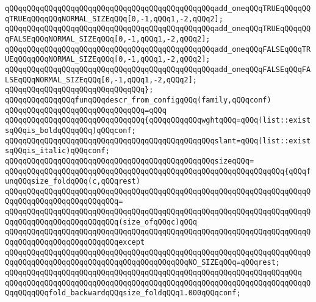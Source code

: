 \verb|qQQqqQQqqQQqqQQqqQQqqQQqqQQqqQQqqQQqqQQqqQQqqQQqadd_oneqQQqTRUEqQQqqQQqTRUEqQQqqQQqNORMAL_SIZEqQQq[0,-1,qQQq1,-2,qQQq2];|\newline
\verb|qQQqqQQqqQQqqQQqqQQqqQQqqQQqqQQqqQQqqQQqqQQqqQQqadd_oneqQQqTRUEqQQqqQQqFALSEqQQqNORMAL_SIZEqQQq[0,-1,qQQq1,-2,qQQq2];|\newline
\verb|qQQqqQQqqQQqqQQqqQQqqQQqqQQqqQQqqQQqqQQqqQQqqQQqadd_oneqQQqFALSEqQQqTRUEqQQqqQQqNORMAL_SIZEqQQq[0,-1,qQQq1,-2,qQQq2];|\newline
\verb|qQQqqQQqqQQqqQQqqQQqqQQqqQQqqQQqqQQqqQQqqQQqqQQqadd_oneqQQqFALSEqQQqFALSEqQQqNORMAL_SIZEqQQq[0,-1,qQQq1,-2,qQQq2];|\newline
\verb|qQQqqQQqqQQqqQQqqQQqqQQqqQQqqQQq};|\newline
\newline
\newline
\verb|qQQqqQQqqQQqqQQqfunqQQqdescr_from_configqQQq(family,qQQqconf)|\newline
\verb|qQQqqQQqqQQqqQQqqQQqqQQqqQQqqQQq=qQQq|\newline
\verb|qQQqqQQqqQQqqQQqqQQqqQQqqQQqqQQq{qQQqqQQqqQQqwghtqQQq=qQQq(list::existsqQQqis_boldqQQqqQQq)qQQqconf;|\newline
\verb|qQQqqQQqqQQqqQQqqQQqqQQqqQQqqQQqqQQqqQQqqQQqqQQqslant=qQQq(list::existsqQQqis_italic)qQQqconf;|\newline
\verb|qQQqqQQqqQQqqQQqqQQqqQQqqQQqqQQqqQQqqQQqqQQqqQQqsizeqQQq=|\newline
\verb|qQQqqQQqqQQqqQQqqQQqqQQqqQQqqQQqqQQqqQQqqQQqqQQqqQQqqQQqqQQqqQQq{qQQqfunqQQqsize_foldqQQq(c,qQQqrest)|\newline
\verb|qQQqqQQqqQQqqQQqqQQqqQQqqQQqqQQqqQQqqQQqqQQqqQQqqQQqqQQqqQQqqQQqqQQqqQQqqQQqqQQqqQQqqQQqqQQqqQQq=|\newline
\verb|qQQqqQQqqQQqqQQqqQQqqQQqqQQqqQQqqQQqqQQqqQQqqQQqqQQqqQQqqQQqqQQqqQQqqQQqqQQqqQQqqQQqqQQqqQQqqQQq(size_ofqQQqc)qQQq|\newline
\verb|qQQqqQQqqQQqqQQqqQQqqQQqqQQqqQQqqQQqqQQqqQQqqQQqqQQqqQQqqQQqqQQqqQQqqQQqqQQqqQQqqQQqqQQqqQQqqQQqexcept|\newline
\verb|qQQqqQQqqQQqqQQqqQQqqQQqqQQqqQQqqQQqqQQqqQQqqQQqqQQqqQQqqQQqqQQqqQQqqQQqqQQqqQQqqQQqqQQqqQQqqQQqqQQqqQQqqQQqqQQqNO_SIZEqQQq=qQQqrest;|\newline
\verb|qQQqqQQqqQQqqQQqqQQqqQQqqQQqqQQqqQQqqQQqqQQqqQQqqQQqqQQqqQQqqQQqqQQq|\newline
\verb|qQQqqQQqqQQqqQQqqQQqqQQqqQQqqQQqqQQqqQQqqQQqqQQqqQQqqQQqqQQqqQQqqQQqqQQqqQQqqQQqfold_backwardqQQqsize_foldqQQq1.000qQQqconf;|\newline
